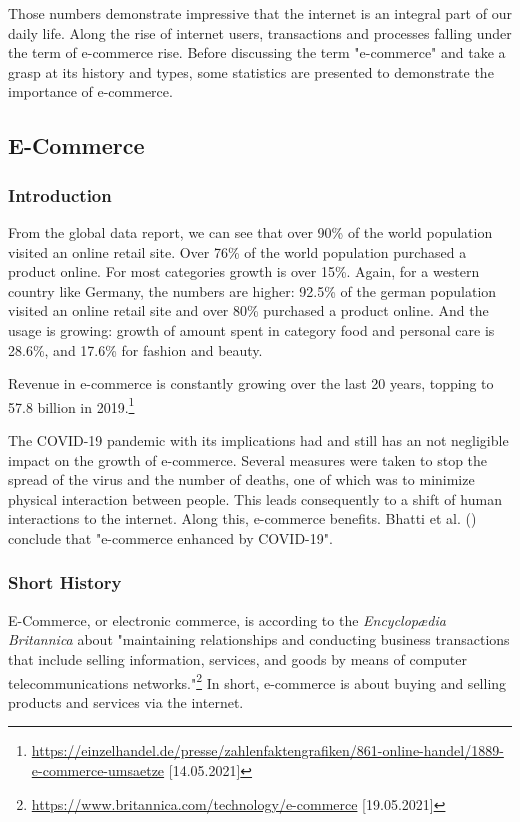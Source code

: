 Those numbers demonstrate impressive that the internet is an integral part of our daily life.
Along the rise of internet users, transactions and processes falling under the term of e-commerce rise.
Before discussing the term "e-commerce" and take a grasp at its history and types, some statistics are presented to demonstrate the importance of e-commerce.


\subsection{E-Commerce}

\subsubsection{Introduction}

From the global data report, we can see that over 90\% of the world population visited an online retail site.
Over 76\% of the world population purchased a product online.
For most categories growth is over 15\%.
Again, for a western country like Germany, the numbers are higher:
92.5\% of the german population visited an online retail site and over 80\% purchased a product online.
And the usage is growing: growth of amount spent in category food and personal care is 28.6\%, and 17.6\% for fashion and beauty.

Revenue in e-commerce is constantly growing over the last 20 years, topping to 57.8 billion in 2019.\footnote{\url{https://einzelhandel.de/presse/zahlenfaktengrafiken/861-online-handel/1889-e-commerce-umsaetze} [14.05.2021]}


The COVID-19 pandemic with its implications had and still has an not negligible impact on the growth of e-commerce.
Several measures were taken to stop the spread of the virus and the number of deaths, one of which was to minimize physical interaction between people.
This leads consequently to a shift of human interactions to the internet.
Along this, e-commerce benefits.
Bhatti et al. (\cite{2020Bhatti}) conclude that "e-commerce enhanced by COVID-19".

\subsubsection{Short History}

E-Commerce, or electronic commerce, is according to the \textit{Encyclopædia Britannica} about "maintaining relationships and conducting business transactions that include selling information, services, and goods by means of computer telecommunications networks."\footnote{\url{https://www.britannica.com/technology/e-commerce} [19.05.2021]}
In short, e-commerce is about buying and selling products and services via the internet.

